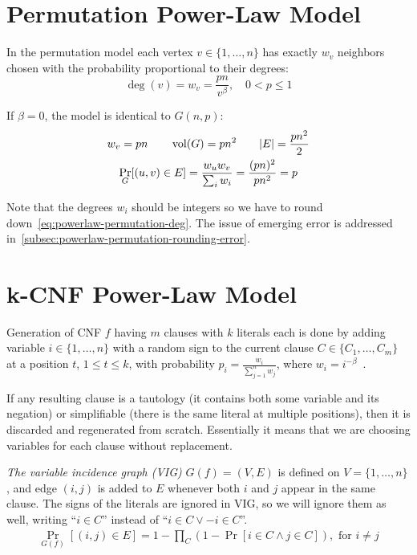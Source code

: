 \section{Permutation Power-Law Model}

In the permutation model each vertex $v\in\{1,\ldots,n\}$ has exactly
$w_v$ neighbors chosen with the probability proportional to their degrees:
\begin{equation}
    \label{eq:powerlaw-permutation-deg}
    \deg(v)=w_v=\frac{pn}{v^\beta},\quad 0<p\leq 1
\end{equation}

If $\beta=0$, the model is identical to $G(n,p)$:
\begin{gather*}
    w_v=pn
    \qquad \operatorname*{vol}(G)=pn^2
    \qquad|E|=\frac{p n^2}{2}\\
    \Pr_G[(u,v)\in E]=\frac{w_u w_v}{\sum_i w_i}=\frac{(pn)^2}{pn^2}=p
\end{gather*}

Note that the degrees $w_i$ should be integers so we have
to round down~\eqref{eq:powerlaw-permutation-deg}. The issue of emerging error
is addressed in~\autoref{subsec:powerlaw-permutation-rounding-error}.

\section{k-CNF Power-Law Model}
\label{sec:powerlaw-k-cnf-model}

Generation of CNF $f$ having $m$ clauses with $k$ literals each is done by adding variable $i\in\{1,\ldots,n\}$
with a random sign to the current clause $C\in\{C_1,\ldots,C_m\}$ at a position $t$, $1\leq t\leq k$, with probability
$p_i=\frac{w_i}{\sum_{j=1}^{n}{w_j}}$, where $w_i=i^{-\beta}$~\cite{abl09}.

If any resulting clause is a tautology (it contains both some variable and its negation) or simplifiable (there is the same literal at multiple positions),
then it is discarded and regenerated from scratch. Essentially it means that we are choosing variables for each clause without replacement.

\textit{The variable incidence graph (VIG)} $G(f)=(V,E)$ is defined on $V=\{1,\ldots,n\}$,
and edge $(i,j)$ is added to $E$ whenever both $i$ and $j$ appear in the same clause.
The signs of the literals are ignored in VIG, so we will ignore them as well,
writing ``$i\in C$'' instead of ``$i\in C\lor-i\in C$''.
\begin{gather}
    \Pr_{G(f)}[(i,j)\in E]=1-\prod_C{(1-\Pr[i\in C\land j\in C])},\text{ for }i\neq j
\end{gather}

